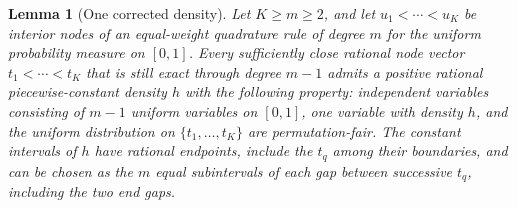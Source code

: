 \documentclass[11pt]{article}
\newtheorem{lemma}[theorem]{Lemma}
\begin{document}
\begin{lemma}[One corrected density]\label{corrector}
Let $K\ge m\ge2$, and let $u_1<\cdots<u_K$ be interior nodes of an
equal-weight quadrature rule of degree $m$ for the uniform probability
measure on $[0,1]$.
Every sufficiently close rational node vector $t_1<\cdots<t_K$ that
is still exact through degree $m-1$ admits a positive rational
piecewise-constant density $h$ with the following property:
independent variables consisting of $m-1$ uniform variables on $[0,1]$,
one variable with density $h$, and the uniform distribution on
$\{t_1,\ldots,t_K\}$ are permutation-fair.
The constant intervals of $h$ have rational endpoints, include the
$t_q$ among their boundaries, and can be chosen as the $m$ equal
subintervals of each gap between successive $t_q$, including the two
end gaps.
\end{lemma}
\end{document}
